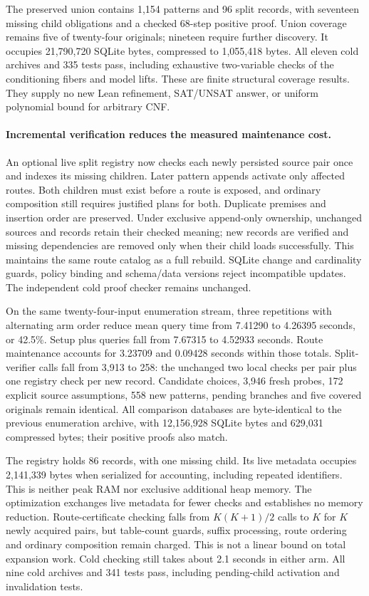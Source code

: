\documentclass[11pt,a4paper]{article}
\numberwithin{equation}{section}
\theoremstyle{plain}
\theoremstyle{definition}
\theoremstyle{remark}
\begin{document}
The preserved union contains 1,154 patterns and 96 split records, with seventeen
missing child obligations and a checked 68-step positive proof. Union coverage
remains five of twenty-four originals; nineteen require further discovery.
It occupies 21,790,720 SQLite bytes, compressed to 1,055,418 bytes. All eleven
cold archives and 335 tests pass, including exhaustive two-variable checks of
the conditioning fibers and model lifts. These are finite structural coverage
results. They supply no new Lean refinement, SAT/UNSAT answer, or uniform
polynomial bound for arbitrary CNF.

\paragraph{Incremental verification reduces the measured maintenance cost.}
An optional live split registry now checks each newly persisted source pair once
and indexes its missing children. Later pattern appends activate only affected
routes. Both children must exist before a route is exposed, and ordinary
composition still requires justified plans for both. Duplicate premises and
insertion order are preserved. Under exclusive append-only ownership, unchanged
sources and records retain their checked meaning; new records are verified and
missing dependencies are removed only when their child loads successfully. This
maintains the same route catalog as a full rebuild. SQLite change and cardinality
guards, policy binding and schema/data versions reject incompatible updates.
The independent cold proof checker remains unchanged.

On the same twenty-four-input enumeration stream, three repetitions with
alternating arm order reduce mean query time from 7.41290 to 4.26395 seconds,
or 42.5\%. Setup plus queries fall from 7.67315 to 4.52933 seconds. Route
maintenance accounts for 3.23709 and 0.09428 seconds within those totals.
Split-verifier calls fall from 3,913 to 258: the unchanged two local checks per
pair plus one registry check per new record. Candidate choices, 3,946 fresh probes,
172 explicit source assumptions, 558 new patterns, pending branches and five
covered originals remain identical. All comparison databases are byte-identical
to the previous enumeration archive, with 12,156,928 SQLite bytes and 629,031
compressed bytes; their positive proofs also match.

The registry holds 86 records, with one missing child. Its live metadata occupies
2,141,339 bytes when serialized for accounting, including repeated identifiers.
This is neither peak RAM nor exclusive additional heap memory. The optimization
exchanges live metadata for fewer checks and establishes no memory reduction.
Route-certificate checking falls from $K(K+1)/2$ calls to $K$ for $K$ newly acquired
pairs, but table-count guards, suffix processing, route ordering and ordinary
composition remain charged. This is not a linear bound on total expansion work.
Cold checking still takes about 2.1 seconds in either arm. All nine cold archives
and 341 tests pass, including pending-child activation and invalidation tests.
\end{document}
